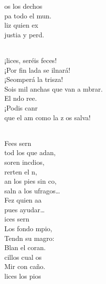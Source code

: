 \documentclass[12pt]{article}
\begin{document}
\begin{multicols*}{2}
\begin{cancion}
	os los dechos\\
	pa todo el mun.\\
	liz quien ex\\
	justia y perd. \\\jump\\
	\begin{chorus}%
	¡lices, seréis feces! \\
	¡Por fin lada se ilnará!\\
	¡Seomperá la trisza!\\
	Sois mil anchas que van a mbrar.\\
	El ndo ree.\\
	¡Podis canr\\
	que el am como la z os salva!\\
	\end{chorus}%
	\jump\\
	Fees sern\\
	tod los que adan,\\
	soren incdios,\\
	rerten el n,\\
	an los pies sin co,\\
	saln a los ufragos… \\
	Fez quien aa\\
	pues  ayudar…\\
	ices sern\\
	Los  fondo mpio,\\
	Tendn su magro:\\
	Blan el coran. \\
	cillos cual os \\
	Mir con caño.\\
	lices los pios\\

\end{cancion}
\end{multicols*}
\end{document}

